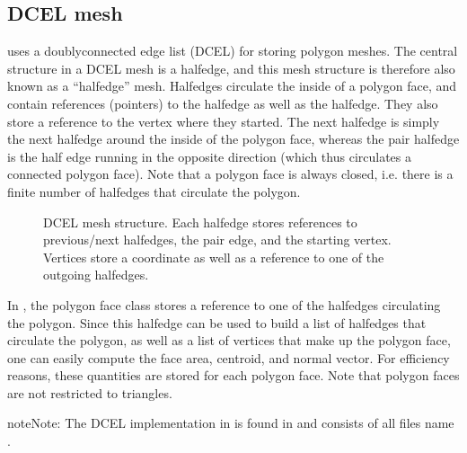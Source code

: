\documentclass[letterpaper,10pt,english]{sphinxmanual}
\let\sphinxpxdimen\pdfpxdimen\else\newdimen\sphinxpxdimen
\begin{document}
\subsection{DCEL mesh}
\label{\detokenize{Utilities/ComplexGeometries:dcel-mesh}}\label{\detokenize{Utilities/ComplexGeometries:chap-dcel}}
 uses a doubly\sphinxhyphen{}connected edge list (DCEL) for storing polygon meshes.
The central structure in a DCEL mesh is a half\sphinxhyphen{}edge, and this mesh structure is therefore also known as a “half\sphinxhyphen{}edge” mesh.
Half\sphinxhyphen{}edges circulate the inside of a polygon face, and contain references (pointers) to the  half\sphinxhyphen{}edge as well as the  half\sphinxhyphen{}edge.
They also store a reference to the vertex where they started.
The next half\sphinxhyphen{}edge is simply the next half\sphinxhyphen{}edge around the inside of the polygon face, whereas the pair half\sphinxhyphen{}edge is the half edge running in the opposite direction (which thus circulates a connected polygon face).
Note that a polygon face is always closed, i.e. there is a finite number of half\sphinxhyphen{}edges that circulate the polygon.

\begin{figure}[htb]
\centering
\capstart

\noindent\sphinxincludegraphics[width=480\sphinxpxdimen]{{DCEL}.png}
\caption{DCEL mesh structure. Each half\sphinxhyphen{}edge stores references to previous/next half\sphinxhyphen{}edges, the pair edge, and the starting vertex.
Vertices store a coordinate as well as a reference to one of the outgoing half\sphinxhyphen{}edges.}\label{\detokenize{Utilities/ComplexGeometries:id2}}\end{figure}

In , the polygon face class stores a reference to one of the half\sphinxhyphen{}edges circulating the polygon.
Since this half\sphinxhyphen{}edge can be used to build a list of half\sphinxhyphen{}edges that circulate the polygon, as well as a list of vertices that make up the polygon face, one can easily compute the face area, centroid, and normal vector.
For efficiency reasons, these quantities are stored for each polygon face.
Note that polygon faces are not restricted to triangles.

\begin{sphinxadmonition}{note}{Note:}
The DCEL implementation in  is found in  and consists of all files name .
\end{sphinxadmonition}
\end{document}
